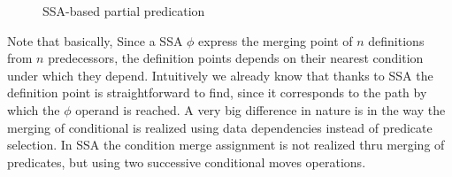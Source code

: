 \begin{figure}
\centering
\caption{SSA-based partial predication}
\label{fig:nest_ssa}
\end{figure}

Note that basically, Since a SSA $\phi$ express the merging point of $n$ definitions from $n$ predecessors, the definition points depends on their nearest condition under which they depend. Intuitively we already know that thanks to SSA the definition point is straightforward to find, since it corresponds to the path by which the $\phi$ operand is reached. 
A very big difference in nature is in the way the merging of conditional is realized using data dependencies instead of predicate selection. In SSA the condition merge assignment is not realized thru merging of predicates, but using two successive conditional moves operations.

